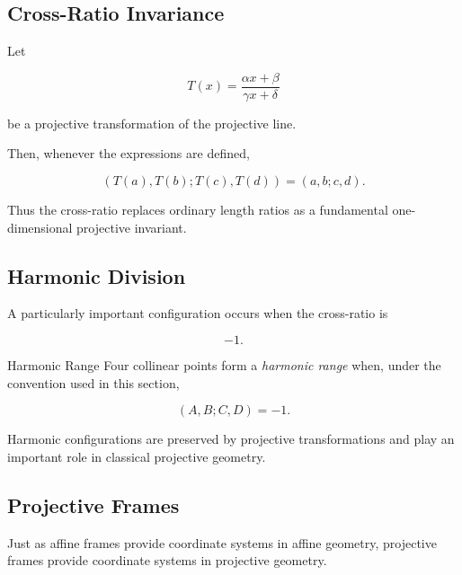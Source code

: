 \subsection{Cross-Ratio Invariance}
\label{subsec:cross-ratio-invariance}

\begin{theorem}
Let

\[
T(x)=\frac{\alpha x+\beta}{\gamma x+\delta}
\]

be a projective transformation of the projective line.

Then, whenever the expressions are defined,

\[
\boxed{
(T(a),T(b);T(c),T(d))
=
(a,b;c,d).
}
\]
\end{theorem}

Thus the cross-ratio replaces ordinary length ratios as a fundamental
one-dimensional projective invariant.

\subsection{Harmonic Division}
\label{subsec:harmonic-division}

A particularly important configuration occurs when the cross-ratio is

\[
-1.
\]

\begin{definitionbox}{Harmonic Range}
Four collinear points form a \emph{harmonic range} when, under the convention
used in this section,

\[
\boxed{
(A,B;C,D)=-1.
}
\]
\end{definitionbox}

Harmonic configurations are preserved by projective transformations and play
an important role in classical projective geometry.

\subsection{Projective Frames}
\label{subsec:projective-frames}

Just as affine frames provide coordinate systems in affine geometry,
projective frames provide coordinate systems in projective geometry.

